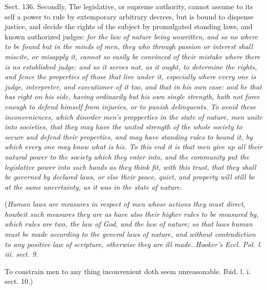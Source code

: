 \documentclass[11pt,openany]{book}
\begin{document}
Sect. 136. Secondly, The legislative, or supreme authority, cannot assume to its self a power to rule by extemporary arbitrary decrees, but is bound to dispense justice, and decide the rights of the subject by promulgated standing laws, and known authorized judges: \emph{for the law of nature being unwritten, and so no where to be found but in the minds of men, they who through passion or interest shall miscite, or misapply it, cannot so easily be convinced of their mistake where there is no established judge: and so it serves not, as it ought, to determine the rights, and fence the properties of those that live under it, especially where every one is judge, interpreter, and executioner of it too, and that in his own case: and he that has right on his side, having ordinarily but his own single strength, hath not force enough to defend himself from injuries, or to punish delinquents. To avoid these inconveniences, which disorder men's propperties in the state of nature, men unite into societies, that they may have the united strength of the whole society to secure and defend their properties, and may have standing rules to bound it, by which every one may know what is his. To this end it is that men give up all their natural power to the society which they enter into, and the community put the legislative power into such hands as they think fit, with this trust, that they shall be governed by declared laws, or else their peace, quiet, and property will still be at the same uncertainty, as it was in the state of nature}.

(\emph{Human laws are measures in respect of men whose actions they must direct, howbeit such measures they are as have also their higher rules to be measured by, which rules are two, the law of God, and the law of nature; so that laws human must be made according to the general laws of nature, and without contradiction to any positive law of scripture, otherwise they are ill made. Hooker's Eccl. Pol. l. iii. sect. 9}.

To constrain men to any thing inconvenient doth seem unreasonable. Ibid. l. i. sect. 10.)
\end{document}
